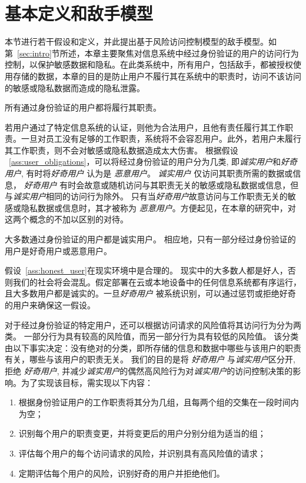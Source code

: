 \section{基本定义和敌手模型}
\label{sec:adversary_model}

本节进行若干假设和定义，并此提出基于风险访问控制模型的敌手模型。如第~\ref{sec:intro}节所述，本章主要聚焦对信息系统中经过身份验证的用户的访问行为控制，以保护敏感数据和隐私。在此类系统中，所有用户，包括敌手，都被授权使用存储的数据，本章的目的是防止用户不履行其在系统中的职责时，访问不该访问的敏感或隐私数据而造成的隐私泄露。

\begin{assumption}
	\label{ass:user_obligations}
	所有通过身份验证的用户都将履行其职责。
\end{assumption}

若用户通过了特定信息系统的认证，则他为合法用户，且他有责任履行其工作职责。一旦对员工没有足够的工作职责，系统将不会容忍用户。此外，若用户未履行其工作职责，则不会对敏感或隐私数据造成太大伤害。 根据假设 ~\ref{ass:user_obligations}，可以将经过身份验证的用户分为几类, 即\emph{诚实用户}和\emph{好奇用户}, 有时将\emph{好奇用户} 认为是 \emph{恶意用户}。 \emph{诚实用户} 仅访问其职责所需的数据或信息，  \emph{好奇用户} 有时会故意或随机访问与其职责无关的敏感或隐私数据或信息，但与\emph{诚实用户}相同的访问行为除外。 只有当\emph{好奇用户}故意访问与工作职责无关的敏感或隐私数据或信息时，其才被称为 \emph{恶意用户}。方便起见，在本章的研究中，对这两个概念的不加以区别的对待。

\begin{assumption}
	\label{ass:honest_user}
	大多数通过身份验证的用户都是诚实用户。 相应地，只有一部分经过身份验证的用户是好奇用户或恶意用户。
\end{assumption}

假设~\ref{ass:honest_user}在现实环境中是合理的。 现实中的大多数人都是好人，否则我们的社会将会混乱。假定部署在云或本地设备中的任何信息系统都有序运行，且大多数用户都是诚实的。一旦\emph{好奇用户} 被系统识别，可以通过惩罚或拒绝好奇的用户来确保这一假设。

对于经过身份验证的特定用户，还可以根据访问请求的风险值将其访问行为分为两类。 一部分行为具有较高的风险值，而另一部分行为具有较低的风险值。 该分类由以下事实决定：没有绝对的分类，即所存储的信息和数据中哪些与该用户的职责有关，哪些与该用户的职责无关。 我们的目的是将 \emph{好奇用户} 与\emph{诚实用户}区分开, 拒绝 \emph{好奇用户}, 并减少\emph{诚实用户}的偶然高风险行为对\emph{诚实用户}的访问控制决策的影响。为了实现该目标，需实现以下内容：

\begin{enumerate}
	\item 根据身份验证用户的工作职责将其分为几组，且每两个组的交集在一段时间内为空；
	\item 识别每个用户的职责变更，并将变更后的用户分别分组为适当的组；
	\item 评估每个用户的每个访问请求的风险，并识别具有高风险值的请求；
	\item 定期评估每个用户的风险，识别好奇的用户并拒绝他们。
\end{enumerate}


